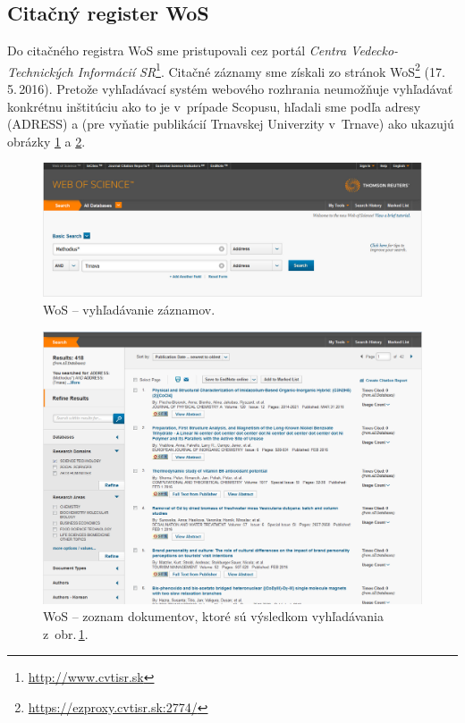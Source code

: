 \subsection{Citačný register WoS}

Do citačného registra WoS sme pristupovali cez portál \emph{Centra
  Vedecko-Technických Informácií SR}\footnote{\url{http://www.cvtisr.sk}}.
Citačné záznamy sme získali zo stránok
WoS\footnote{\url{https://ezproxy.cvtisr.sk:2774/}} (17.\,5.\,2016).  Pretože
vyhľadávací systém webového rozhrania neumožňuje vyhľadávať konkrétnu inštitúciu
ako to je v~prípade Scopusu, hľadali sme podľa adresy (ADRESS)  a
 (pre vyňatie publikácií Trnavskej Univerzity v~Trnave) ako
ukazujú obrázky \ref{fig:wos.search} a \ref{fig:wos.documentlist}.

\begin{figure}
  \centering
  \includegraphics[width=\textwidth]{obr/wos01-cut.jpg}
  \caption{WoS -- vyhľadávanie záznamov.}
  \label{fig:wos.search}
\end{figure}

\begin{figure}
  \centering
  \includegraphics[width=\textwidth]{obr/wos02-cut.jpg}
  \caption{WoS -- zoznam dokumentov, ktoré sú výsledkom vyhľadávania
    z~obr.\,\ref{fig:wos.search}.}
  \label{fig:wos.documentlist}
\end{figure}

